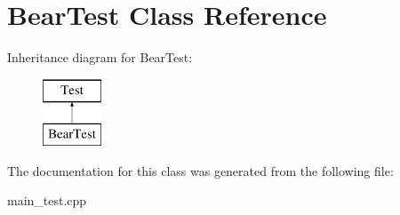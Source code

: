 \hypertarget{class_bear_test}{}\section{Bear\+Test Class Reference}
\label{class_bear_test}
Inheritance diagram for Bear\+Test\+:\begin{figure}[H]
\begin{center}
\leavevmode
\includegraphics[height=2.000000cm]{class_bear_test}
\end{center}
\end{figure}


The documentation for this class was generated from the following file\+:\begin{DoxyCompactItemize}
\item 
main\+\_\+test.\+cpp\end{DoxyCompactItemize}
